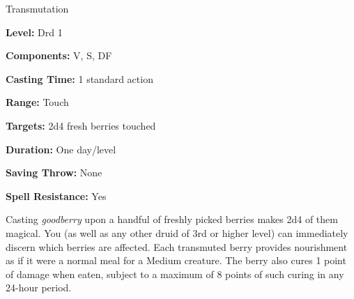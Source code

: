 
Transmutation

\textbf{Level:} Drd 1

\textbf{Components:} V, S, DF

\textbf{Casting Time:} 1 standard action

\textbf{Range:} Touch

\textbf{Targets:} 2d4 fresh berries touched

\textbf{Duration:} One day/level

\textbf{Saving Throw:} None

\textbf{Spell Resistance:} Yes

Casting \textit{goodberry} upon a handful of freshly picked berries makes 2d4 of 
them magical. You (as well as any other druid of 3rd or higher level) can immediately 
discern which berries are affected. Each transmuted berry provides nourishment 
as if it were a normal meal for a Medium creature. The berry also cures 1 point 
of damage when eaten, subject to a maximum of 8 points of such curing in any 24-hour 
period.

